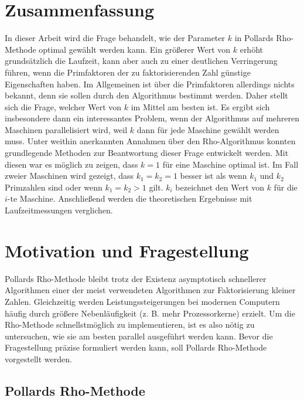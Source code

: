\documentclass[a4paper, 11pt, ngerman]{article}
\theoremstyle{definition}
\theoremstyle{plain}
\theoremstyle{remark}
\begin{document}
\newpage

\section{Zusammenfassung}

In dieser Arbeit wird die Frage behandelt, wie der Parameter $k$ in Pollards Rho-Methode optimal gewählt werden kann. Ein größerer Wert von $k$ erhöht grundsätzlich die Laufzeit, kann aber auch zu einer deutlichen Verringerung führen, wenn die Primfaktoren der zu faktorisierenden Zahl günstige Eigenschaften haben. Im Allgemeinen ist über die Primfaktoren allerdings nichts bekannt, denn sie sollen durch den Algorithmus bestimmt werden. Daher stellt sich die Frage, welcher Wert von $k$ im Mittel am besten ist. Es ergibt sich insbesondere dann ein interessantes Problem, wenn der Algorithmus auf mehreren Maschinen parallelisiert wird, weil $k$ dann für jede Maschine gewählt werden muss. Unter weithin anerkannten Annahmen über den Rho-Algorithmus konnten grundlegende Methoden zur Beantwortung dieser Frage entwickelt werden. Mit diesen war es möglich zu zeigen, dass $k = 1$ für eine Maschine optimal ist. Im Fall zweier Maschinen wird gezeigt, dass $k_1 = k_2 = 1$ besser ist als wenn $k_1$ und $k_2$ Primzahlen sind oder wenn $k_1 = k_2 > 1$ gilt. $k_i$ bezeichnet den Wert von $k$ für die $i$-te Maschine. Anschließend werden die theoretischen Ergebnisse mit Laufzeitmessungen verglichen.

\section{Motivation und Fragestellung}

Pollards Rho-Methode bleibt trotz der Existenz asymptotisch schnellerer Algorithmen einer der meist verwendeten Algorithmen zur Faktorisierung kleiner Zahlen. Gleichzeitig werden Leistungssteigerungen bei modernen Computern häufig durch größere Nebenläufigkeit (z. B. mehr Prozessorkerne) erzielt. Um die Rho-Methode schnellstmöglich zu implementieren, ist es also nötig zu untersuchen, wie sie am besten parallel ausgeführt werden kann. Bevor die Fragestellung präzise formuliert werden kann, soll Pollards Rho-Methode vorgestellt werden.

\subsection{Pollards Rho-Methode}
\label{sec:pollards-rho-method}
\end{document}
